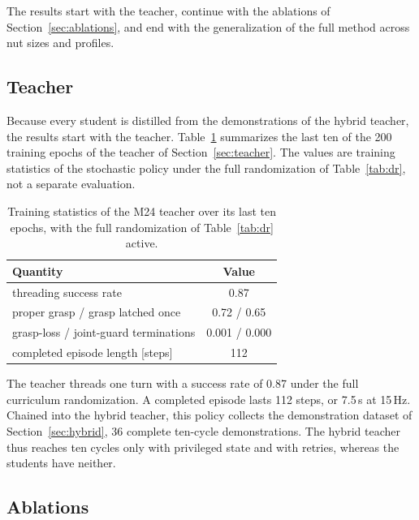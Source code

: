 The results start with the teacher, continue with the ablations of Section~\ref{sec:ablations}, and end with the generalization of the full method across nut sizes and profiles.

\subsection{Teacher}\label{sec:results-teacher}

Because every student is distilled from the demonstrations of the hybrid teacher, the results start with the teacher. Table~\ref{tab:teacher-results} summarizes the last ten of the 200 training epochs of the teacher of Section~\ref{sec:teacher}. The values are training statistics of the stochastic policy under the full randomization of Table~\ref{tab:dr}, not a separate evaluation.

\begin{table}[htb]%
    \centering%
    \caption{Training statistics of the M24 teacher over its last ten epochs, with the full randomization of Table~\ref{tab:dr} active.}%
    \label{tab:teacher-results}%
    \small
    \begin{tabular}{lc}
        \toprule
        Quantity & Value \\
        \midrule
        threading success rate & 0.87 \\
        proper grasp / grasp latched once & 0.72 / 0.65 \\
        grasp-loss / joint-guard terminations & 0.001 / 0.000 \\
        completed episode length [steps] & 112 \\
        \bottomrule
    \end{tabular}
\end{table}%

The teacher threads one turn with a success rate of 0.87 under the full curriculum randomization. A completed episode lasts 112 steps, or 7.5\,s at 15\,Hz. Chained into the hybrid teacher, this policy collects the demonstration dataset of Section~\ref{sec:hybrid}, 36 complete ten-cycle demonstrations. The hybrid teacher thus reaches ten cycles only with privileged state and with retries, whereas the students have neither.

\subsection{Ablations}\label{sec:results-ablations}

